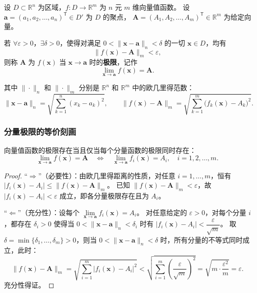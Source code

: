 \documentclass[lang=cn,11pt]{elegantbook}
\begin{document}
\begin{definition}[向量值函数的极限] \label{def:vec-limit}
设 $D\subset\mathbb R^n$ 为区域，$f:D\to\mathbb R^m$ 为 $n$ 元 $m$ 维向量值函数。
设 $\boldsymbol a=(a_1,a_2,\dots,a_n)^{\mathsf T}\in D'$ 为 $D$ 的聚点，
$\boldsymbol A=(A_1,A_2,\dots,A_m)^{\mathsf T}\in\mathbb R^m$ 为给定向量。

若 $\forall\varepsilon>0$，$\exists\delta>0$，使得对满足 $0<\|\boldsymbol x-\boldsymbol a\|_n<\delta$ 的一切 $\boldsymbol x\in D$，均有
\[
\|f(\boldsymbol x)-\boldsymbol A\|_m<\varepsilon,
\]
则称 $\boldsymbol A$ 为 $f(\boldsymbol x)$ 当 $\boldsymbol x\to\boldsymbol a$ 时的\textbf{极限}，记作
\[
\lim_{\boldsymbol x\to\boldsymbol a}f(\boldsymbol x)=\boldsymbol A.
\]

其中 $\|\cdot\|_n$ 和 $\|\cdot\|_m$ 分别是 $\mathbb R^n$ 和 $\mathbb R^m$ 中的欧几里得范数：
\[
\|\boldsymbol x-\boldsymbol a\|_n = \sqrt{\sum_{k=1}^{n}(x_k-a_k)^2},\qquad
\|f(\boldsymbol x)-\boldsymbol A\|_m = \sqrt{\sum_{k=1}^{m}\bigl(f_k(\boldsymbol x)-A_k\bigr)^2}.
\]
\end{definition}


\subsubsection*{分量极限的等价刻画}

\begin{property}[极限的分量等价性] \label{prop:vec-limit-component}
向量值函数的极限存在当且仅当每个分量函数的极限同时存在：
\[
\lim_{\boldsymbol x\to\boldsymbol a}f(\boldsymbol x)=\boldsymbol A
\quad\Longleftrightarrow\quad
\lim_{\boldsymbol x\to\boldsymbol a}f_i(\boldsymbol x)=A_i,\quad i=1,2,\dots,m.
\]
\end{property}

\begin{proof}
“$\Rightarrow$”（必要性）：由欧几里得距离的性质，对任意 $i=1,\dots,m$，恒有 $|f_i(\boldsymbol x)-A_i| \leqslant  \|f(\boldsymbol x)-\boldsymbol A\|_m$。
已知 $\|f(\boldsymbol x)-\boldsymbol A\|_m<\varepsilon$，故 $|f_i(\boldsymbol x)-A_i|<\varepsilon$ 成立，即各分量极限存在且为 $A_i$。

“$\Leftarrow$”（充分性）：设每个 $\lim\limits_{\boldsymbol x\to\boldsymbol a}f_i(\boldsymbol x)=A_i$。
对任意给定的 $\varepsilon>0$，对每个分量 $i$，都存在 $\delta_i>0$ 使得当 $0<\|\boldsymbol x-\boldsymbol a\|_n<\delta_i$ 时有 $|f_i(\boldsymbol x)-A_i|<\dfrac\varepsilon{\sqrt{m}}$。
取 $\delta=\min\{\delta_1,\dots,\delta_m\}>0$，则当 $0<\|\boldsymbol x-\boldsymbol a\|_n<\delta$ 时，所有分量的不等式同时成立，此时：
\[
\|f(\boldsymbol x)-\boldsymbol A\|_m
=\sqrt{\sum_{i=1}^{m}|f_i(\boldsymbol x)-A_i|^2}
<\sqrt{\sum_{i=1}^{m}\left(\frac{\varepsilon}{\sqrt{m}}\right)^2}
=\sqrt{m\cdot\frac{\varepsilon^2}{m}}=\varepsilon.
\]
充分性得证。
\end{proof}
\end{document}
